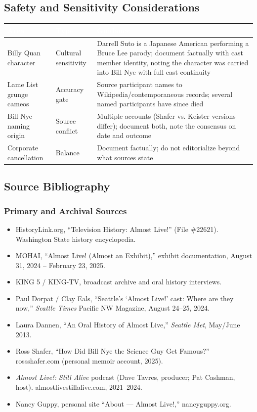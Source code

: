 \documentclass[11pt,letterpaper]{article}
\newcommand{\tableheader}[1]{\textbf{\sffamily\textcolor{white}{#1}}}
\begin{document}
\subsection{Safety and Sensitivity Considerations}

\begin{center}
\begin{tabularx}{\textwidth}{L{4cm}L{2.5cm}X}
\toprule
{}
\tableheader{Area} & \tableheader{Type} & \tableheader{Guidance} \\
\midrule
Billy Quan character & Cultural sensitivity & Darrell Suto is a Japanese American performing a Bruce Lee parody; document factually with cast member identity, noting the character was carried into Bill Nye with full cast continuity \\
Lame List grunge cameos & Accuracy gate & Source participant names to Wikipedia/contemporaneous records; several named participants have since died \\
Bill Nye naming origin & Source conflict & Multiple accounts (Shafer vs. Keister versions differ); document both, note the consensus on date and outcome \\
Corporate cancellation & Balance & Document factually; do not editorialize beyond what sources state \\
\bottomrule
\end{tabularx}
\end{center}

\subsection{Source Bibliography}

\subsubsection{Primary and Archival Sources}
\begin{itemize}[noitemsep]
  \item HistoryLink.org, ``Television History: Almost Live!'' (File \#22621). Washington State history encyclopedia.
  \item MOHAI, ``Almost Live! (Almost an Exhibit),'' exhibit documentation, August 31, 2024 -- February 23, 2025.
  \item KING 5 / KING-TV, broadcast archive and oral history interviews.
  \item Paul Dorpat / Clay Eals, ``Seattle's `Almost Live!' cast: Where are they now,'' \textit{Seattle Times} Pacific NW Magazine, August 24--25, 2024.
  \item Laura Dannen, ``An Oral History of Almost Live,'' \textit{Seattle Met}, May/June 2013.
  \item Ross Shafer, ``How Did Bill Nye the Science Guy Get Famous?'' rossshafer.com (personal memoir account, 2025).
  \item \textit{Almost Live!: Still Alive} podcast (Dave Tavres, producer; Pat Cashman, host). almostlivestillalive.com, 2021--2024.
  \item Nancy Guppy, personal site ``About --- Almost Live!,'' nancyguppy.org.
\end{itemize}
\end{document}
